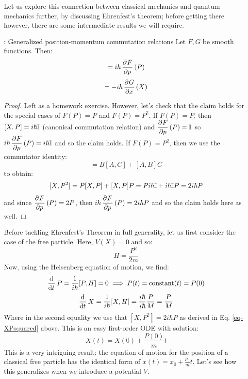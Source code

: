 Let us explore this connection between classical mechanics and quantum mechanics further, by discussing Ehrenfest's theorem; before getting there however, there are some intermediate results we will require.

\begin{lembox}{: Generalized position-momentum commutation relations}
    Let $F, G$ be smooth functions. Then:
    \begin{equation}
        [X, F(P)] = i\hbar\dpd{F}{p}(P)
    \end{equation}
    \begin{equation}
        [P, G(X)] = -i\hbar\dpd{G}{x}(X)
    \end{equation}
\end{lembox}
\begin{proof}
    Left as a homework exercise. However, let's check that the claim holds for the special cases of $F(P) = P$ and $F(P) = P^2$. If $F(P) = P$, then $[X, P] = i\hbar\mathbb{I}$ (canonical commutation relation) and $\dpd{F}{p}(P) = \II$ so $i\hbar\dpd{F}{p}(P) = i\hbar\II$ and so the claim holds. If $F(P) = P^2$, then we use the commutator identity:
    \begin{equation}
        [A, BC] = B[A, C] + [A, B]C
    \end{equation}
    to obtain:
    \begin{equation}\label{eq-XPsquared}
        [X, P^2] = P[X, P] + [X, P]P = Pi\hbar\mathbb{I} + i\hbar\mathbb{I} P = 2i\hbar P
    \end{equation}
    and since $\dpd{F}{p}(P) = 2P$, then $i\hbar\dpd{F}{p}(P) = 2i\hbar P$ and so the claim holds here as well.
\end{proof}

Before tackling Ehrenfest's Theorem in full generality, let us first consider the case of the free particle. Here, $V(X) = 0$ and so:
\begin{equation}
    H = \frac{P^2}{2m}
\end{equation}
Now, using the Heisenberg equation of motion, we find:
\begin{equation}
    \dod{}{t}P = \frac{1}{i\hbar}[P, H] = 0 \implies P(t) = \text{constant}(t) = P(0)
\end{equation}
\begin{equation}
    \dod{}{t}X = \frac{1}{i\hbar}[X, H] = \frac{i\hbar}{i\hbar}\frac{P}{M} = \frac{P}{M}
\end{equation}
Where in the second equality we use that $[X, P^2] = 2i\hbar P$ as derived in Eq. \eqref{eq-XPsquared} above. This is an easy first-order ODE with solution:
\begin{equation}
    X(t) = X(0) + \frac{P(0)}{m}t
\end{equation}
This is a very intriguing result; the equation of motion for the position of a classical free particle has the identical form of $x(t) = x_0 + \frac{p_0}{m}t$. Let's see how this generalizes when we introduce a potential $V$.

